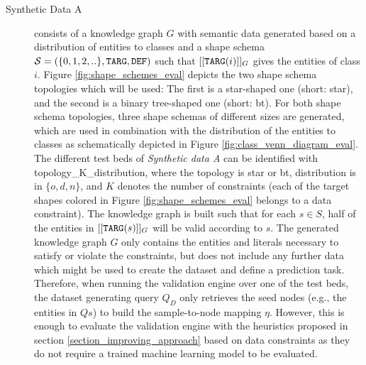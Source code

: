 \begin{description}
    \item[Synthetic Data A] consists of a knowledge graph $G$ with semantic data generated based on a distribution of entities to classes and a shape schema $\mathcal{S} = (\{0,1,2,..\}, \texttt{TARG}, \texttt{DEF})$ such that $[[\texttt{TARG}(i)]]_G$ gives the entities of class $i$. Figure \ref{fig:shape_schemes_eval} depicts the two shape schema topologies which will be used: The first is a star-shaped one (short: star), and the second is a binary tree-shaped one (short: bt). For both shape schema topologies, three shape schemas of different sizes are generated, which are used in combination with the distribution of the entities to classes as schematically depicted in Figure \ref{fig:class_venn_diagram_eval}. The different test beds of \textit{Synthetic data A} can be identified with topology\_K\_distribution, where the topology is star or bt, distribution is in $\{o,d,n\}$, and $K$ denotes the number of constraints (each of the target shapes colored in Figure \ref{fig:shape_schemes_eval} belongs to a data constraint). 
    The knowledge graph is built such that for each $s \in S$, half of the entities in $[[\texttt{TARG}(s)]]_G$ will be valid according to $s$. The generated knowledge graph $G$ only contains the entities and literals necessary to satisfy or violate the constraints, but does not include any further data which might be used to create the dataset and define a prediction task. Therefore, when running the validation engine over one of the test beds, the dataset generating query $Q_D$ only retrieves the seed nodes (e.g., the entities in $Qs$) to build the sample-to-node mapping $\eta$. However, this is enough to evaluate the validation engine with the heuristics proposed in section \ref{section_improving_approach} based on data constraints as they do not require a trained machine learning model to be evaluated.
    

\end{description}
